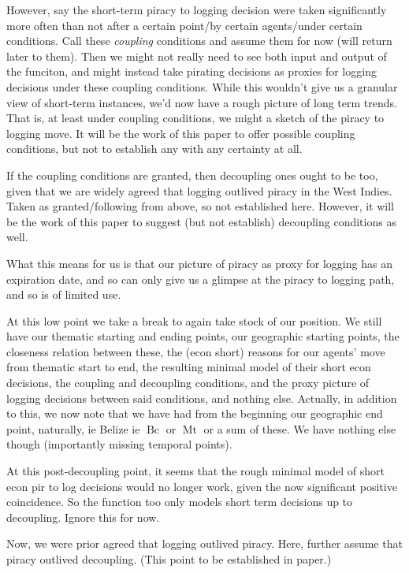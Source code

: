 \documentclass{amsart}
\DeclareMathOperator{\mt}{Mt}%
\DeclareMathOperator{\bc}{Bc}%
\theoremstyle{definition}%
\theoremstyle{definition}%
\theoremstyle{remark}%
\theoremstyle{definition}%
\theoremstyle{definition}%
\begin{document}
However, say the short-term piracy to logging decision were taken significantly more often than not after a certain point/by certain agents/under certain conditions. Call these \emph{coupling} conditions %
and assume them for now (will return later to them). Then we might not really need to see both input and output of the funciton, and might instead take pirating decisions as proxies for logging decisions under these coupling conditions. While this wouldn't give us a granular view of short-term instances, we'd now have a rough picture of long term trends. That is, at least under coupling conditions, we might a sketch of the piracy to logging move. It will be the work of this paper to offer possible coupling conditions, but not to establish any with any certainty at all.

If the coupling conditions are granted, then decoupling ones ought to be too, given that we are widely agreed that logging outlived piracy in the West Indies. Taken as granted/following from above, so not established here. However, it will be the work of this paper to suggest (but not establish) decoupling conditions as well.

What this means for us is that our picture of piracy as proxy for logging has an expiration date, and so can only give us a glimpse at the piracy to logging path, and so is of limited use.

At this low point we take a break to again take stock of our position. We still have our thematic starting and ending points, our geographic starting points, the closeness relation between these, the (econ short) reasons for our agents' move from thematic start to end, the resulting minimal model of their short econ decisions, the coupling and decoupling conditions, and the proxy picture of logging decisions between said conditions, and nothing else. Actually, in addition to this, we now note that we have had from the beginning our geographic end point, naturally, ie Belize ie \(\bc\) or \(\mt\) or a sum of these. We have nothing else though (importantly missing temporal points).

At this post-decoupling point, it seems that the rough minimal model of short econ pir to log decisions would no longer work, given the now significant positive coincidence. So the function too only models short term decisions up to decoupling. Ignore this for now.%

Now, we were prior agreed that logging outlived piracy. Here, further assume that piracy outlived decoupling. (This point to be established in paper.) 
\end{document}
